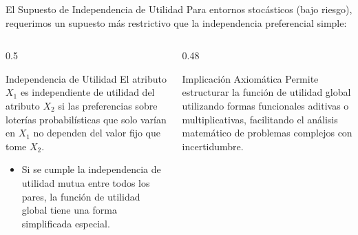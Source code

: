 \documentclass[aspectratio=169, 10pt]{beamer}
\begin{document}
\begin{frame}{El Supuesto de Independencia de Utilidad}
    Para entornos stocásticos (bajo riesgo), requerimos un supuesto más restrictivo que la independencia preferencial simple:
    \begin{columns}
        \begin{column}{0.5\textwidth}
            \begin{block}{Independencia de Utilidad}
                El atributo $X_1$ es independiente de utilidad del atributo $X_2$ si las preferencias sobre loterías probabilísticas que solo varían en $X_1$ no dependen del valor fijo que tome $X_2$.
                \begin{itemize}
                    \item Si se cumple la independencia de utilidad mutua entre todos los pares, la función de utilidad global tiene una forma simplificada especial.
                \end{itemize}
            \end{block}
        \end{column}
        
        \begin{column}{0.48\textwidth}
            \begin{exampleblock}{Implicación Axiomática}
                Permite estructurar la función de utilidad global utilizando formas funcionales aditivas o multiplicativas, facilitando el análisis matemático de problemas complejos con incertidumbre.
            \end{exampleblock}
        \end{column}
    \end{columns}
\end{frame}
\end{document}
